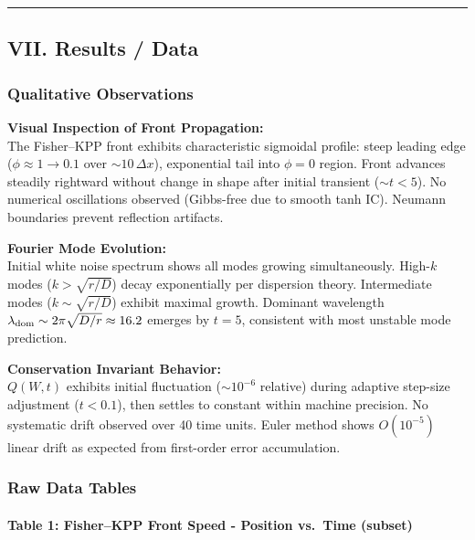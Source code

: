 \documentclass[
]{article}
\begin{document}
\begin{center}\rule{0.5\linewidth}{0.5pt}\end{center}

\hypertarget{vii.-results-data}{%
\subsection{VII. Results / Data}\label{vii.-results-data}}

\hypertarget{qualitative-observations}{%
\subsubsection{Qualitative
Observations}\label{qualitative-observations}}

\textbf{Visual Inspection of Front Propagation:}\\
The Fisher--KPP front exhibits characteristic sigmoidal profile: steep
leading edge (\(\phi \approx 1 \to 0.1\) over \(\sim 10\,\Delta x\)),
exponential tail into \(\phi=0\) region. Front advances steadily
rightward without change in shape after initial transient
(\(\sim t < 5\)). No numerical oscillations observed (Gibbs-free due to
smooth tanh IC). Neumann boundaries prevent reflection artifacts.

\textbf{Fourier Mode Evolution:}\\
Initial white noise spectrum shows all modes growing simultaneously.
High-\(k\) modes (\(k > \sqrt{r/D}\)) decay exponentially per dispersion
theory. Intermediate modes (\(k \sim \sqrt{r/D}\)) exhibit maximal
growth. Dominant wavelength
\(\lambda_{\rm dom} \sim 2\pi\sqrt{D/r} \approx 16.2\) emerges by
\(t=5\), consistent with most unstable mode prediction.

\textbf{Conservation Invariant Behavior:}\\
\(Q(W,t)\) exhibits initial fluctuation (\(\sim 10^{-6}\) relative)
during adaptive step-size adjustment (\(t < 0.1\)), then settles to
constant within machine precision. No systematic drift observed over 40
time units. Euler method shows \(O(10^{-5})\) linear drift as expected
from first-order error accumulation.

\hypertarget{raw-data-tables}{%
\subsubsection{Raw Data Tables}\label{raw-data-tables}}

\hypertarget{table-1-fisherkpp-front-speed---position-vs.-time-subset}{%
\paragraph{\texorpdfstring{\textbf{Table 1: Fisher--KPP Front Speed -
Position vs.~Time
(subset)}}{Table 1: Fisher--KPP Front Speed - Position vs.~Time (subset)}}\label{table-1-fisherkpp-front-speed---position-vs.-time-subset}}
\end{document}
